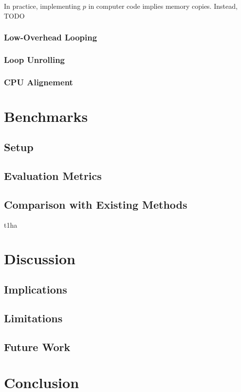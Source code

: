 \documentclass[10pt]{article}
\begin{document}
In practice, implementing \( p \) in computer code implies memory copies. Instead, TODO

\subsubsection{Low-Overhead Looping}

\subsubsection{Loop Unrolling}

\subsubsection{CPU Alignement}


\section{Benchmarks}
\subsection{Setup}
\subsection{Evaluation Metrics}
\subsection{Comparison with Existing Methods}

t1ha\cite{rust-t1ha}

\section{Discussion}
\subsection{Implications}
\subsection{Limitations}
\subsection{Future Work}

\section{Conclusion}



\end{document}
